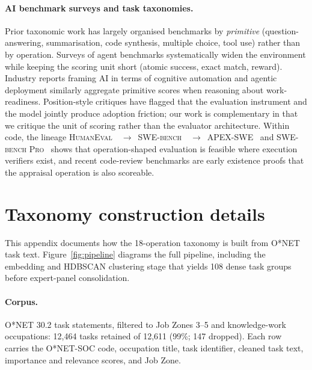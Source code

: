 \documentclass{article}
\begin{document}
\paragraph{AI benchmark surveys and task taxonomies.} Prior taxonomic work has largely organised benchmarks by \emph{primitive} (question-answering, summarisation, code synthesis, multiple choice, tool use) rather than by operation.
Surveys of agent benchmarks \citep{webarena2023,workarena2024,osworld2024,officebench2024,gaia2023} systematically widen the environment while keeping the scoring unit short (atomic success, exact match, reward).
Industry reports framing AI in terms of cognitive automation and agentic deployment \citep{a16z2026adoption,brynjolfsson2026playbook,microsoft2024workplaces} similarly aggregate primitive scores when reasoning about work-readiness.
Position-style critiques have flagged that the evaluation instrument and the model jointly produce adoption friction; our work is complementary in that we critique the unit of scoring rather than the evaluator architecture.
Within code, the lineage \textsc{HumanEval}~\citep{chen2021humaneval}~$\to$~\textsc{SWE-bench}~\citep{jimenez2024swebench}~$\to$~\textsc{APEX-SWE}~\citep{kottamasu2026apex} and \textsc{SWE-bench Pro}~\citep{swebenchpro2025} shows that operation-shaped evaluation is feasible where execution verifiers exist, and recent code-review benchmarks \citep{sweprbench2025,codefusecrbench2025,withmartiancr2024} are early existence proofs that the appraisal operation is also scoreable.

\section{Taxonomy construction details}
\label{app:taxonomy}

This appendix documents how the 18-operation taxonomy is built from O{*}NET task text.
Figure~\ref{fig:pipeline} diagrams the full pipeline, including the embedding and HDBSCAN clustering stage that yields 108 dense task groups before expert-panel consolidation.

\paragraph{Corpus.} O{*}NET 30.2 task statements, filtered to Job Zones 3--5 and knowledge-work occupations: 12{,}464 tasks retained of 12{,}611 (99\%; 147 dropped).
Each row carries the O*NET-SOC code, occupation title, task identifier, cleaned task text, importance and relevance scores, and Job Zone.
\end{document}
